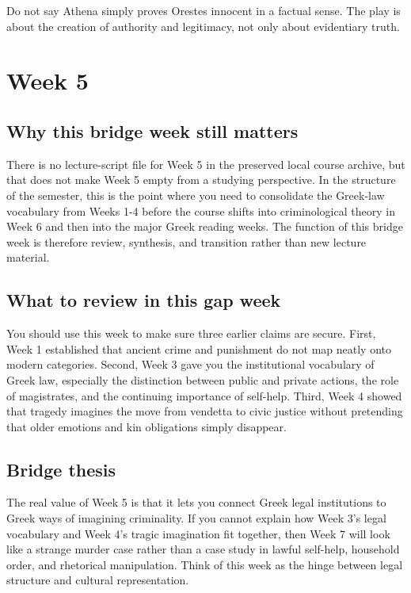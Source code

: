 \documentclass[11pt]{article}
\begin{document}
Do not say Athena simply proves Orestes innocent in a factual sense. The play is about the creation of authority and legitimacy, not only about evidentiary truth.

\section{Week 5}

\subsection{Why this bridge week still matters}

There is no lecture-script file for Week 5 in the preserved local course archive, but that does not make Week 5 empty from a studying perspective. In the structure of the semester, this is the point where you need to consolidate the Greek-law vocabulary from Weeks 1-4 before the course shifts into criminological theory in Week 6 and then into the major Greek reading weeks. The function of this bridge week is therefore review, synthesis, and transition rather than new lecture material.

\subsection{What to review in this gap week}

You should use this week to make sure three earlier claims are secure. First, Week 1 established that ancient crime and punishment do not map neatly onto modern categories. Second, Week 3 gave you the institutional vocabulary of Greek law, especially the distinction between public and private actions, the role of magistrates, and the continuing importance of self-help. Third, Week 4 showed that tragedy imagines the move from vendetta to civic justice without pretending that older emotions and kin obligations simply disappear.

\subsection{Bridge thesis}

The real value of Week 5 is that it lets you connect Greek legal institutions to Greek ways of imagining criminality. If you cannot explain how Week 3's legal vocabulary and Week 4's tragic imagination fit together, then Week 7 will look like a strange murder case rather than a case study in lawful self-help, household order, and rhetorical manipulation. Think of this week as the hinge between legal structure and cultural representation.
\end{document}
